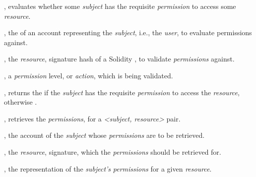 \begin{interface}
  \item \specification{}
  \begin{functions}
    \item {},
      evaluates whether some \emph{subject} has the requisite \emph{permission}
      to access some \emph{resource}.

      \begin{parameters}
        \item {}, the  of an account
          representing the \emph{subject}, i.e., the \emph{user}, to evaluate
          permissions against.
        \item {}, the \emph{resource}, signature hash of a
          Solidity , to validate \emph{permissions} against.
        \item {}, a \emph{permission} level, or
          \emph{action}, which is being validated.
      \end{parameters}

      \begin{returns}
        \item {}, returns the  if the
          \emph{subject} has the requisite \emph{permission} to access the
          \emph{resource}, otherwise .
      \end{returns}

    \item {},
      retrieves the \emph{permissions}, for a \emph{<subject, resource>} pair.

      \begin{parameters}
        \item {}, the account  of the
          \emph{subject} whose \emph{permissions} are to be retrieved.

        \item {}, the \emph{resource}, 
          signature, which the \emph{permissions} should be retrieved for.
      \end{parameters}

      \begin{returns}
      \item {}, the  representation of the
        \emph{subject's} \emph{permissions} for a given \emph{resource}.
      \end{returns}


\end{functions}
\end{interface}
